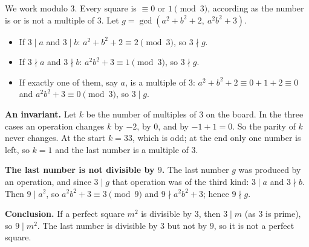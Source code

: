 We work modulo $3$. Every square is $\equiv0$ or $1\pmod3$, according as the number is or is not a multiple of $3$. Let $g=\gcd\left(a^2+b^2+2,\ a^2b^2+3\right)$.
\begin{itemize}
\item If $3\mid a$ and $3\mid b$: $a^2+b^2+2\equiv2\pmod3$, so $3\nmid g$.
\item If $3\nmid a$ and $3\nmid b$: $a^2b^2+3\equiv1\pmod3$, so $3\nmid g$.
\item If exactly one of them, say $a$, is a multiple of $3$: $a^2+b^2+2\equiv0+1+2\equiv0$ and $a^2b^2+3\equiv0\pmod3$, so $3\mid g$.
\end{itemize}

\textbf{An invariant.} Let $k$ be the number of multiples of $3$ on the board. In the three cases an operation changes $k$ by $-2$, by $0$, and by $-1+1=0$. So the parity of $k$ never changes. At the start $k=33$, which is odd; at the end only one number is left, so $k=1$ and the last number is a multiple of $3$.

\textbf{The last number is not divisible by $9$.} The last number $g$ was produced by an operation, and since $3\mid g$ that operation was of the third kind: $3\mid a$ and $3\nmid b$. Then $9\mid a^2$, so $a^2b^2+3\equiv3\pmod9$ and $9\nmid a^2b^2+3$; hence $9\nmid g$.

\textbf{Conclusion.} If a perfect square $m^2$ is divisible by $3$, then $3\mid m$ (as $3$ is prime), so $9\mid m^2$. The last number is divisible by $3$ but not by $9$, so it is not a perfect square.
